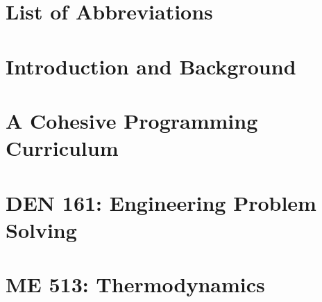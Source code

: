 \documentclass[12pt]{report}
\begin{document}
    

    
    
    


    \clearpage
    \setcounter{page}{1}
    \tableofcontents

    \clearpage
    \listoffigures


    \clearpage
    \listofassignments


    \clearpage
    \chapter*{List of Abbreviations}
    
    
    \clearpage
    \setcounter{page}{1}
    \chapter{Introduction and Background}
    

    \clearpage
    \chapter{A Cohesive Programming Curriculum}
    
    
    \clearpage
    \chapter{DEN 161: Engineering Problem Solving}
    

    \clearpage
    \chapter{ME 513: Thermodynamics}
    
\end{document}
